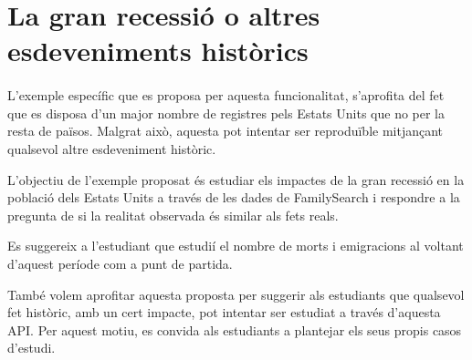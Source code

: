 \section{La gran recessió o altres esdeveniments històrics}

    \paragraph{}
    L'exemple específic que es proposa per aquesta funcionalitat, s'aprofita del fet que es disposa d'un major nombre de registres pels Estats Units que no per la resta de països. Malgrat això, aquesta pot intentar ser reproduïble mitjançant qualsevol altre esdeveniment històric.

    L'objectiu de l'exemple proposat és estudiar els impactes de la gran recessió en la població dels Estats Units a través de les dades de FamilySearch i respondre a la pregunta de si la realitat observada és similar als fets reals.

    Es suggereix a l'estudiant que estudií el nombre de morts i emigracions al voltant d'aquest període com a punt de partida.

    També volem aprofitar aquesta proposta per suggerir als estudiants que qualsevol fet històric, amb un cert impacte, pot intentar ser estudiat a través d'aquesta API. Per aquest motiu, es convida als estudiants a plantejar els seus propis casos d'estudi.
